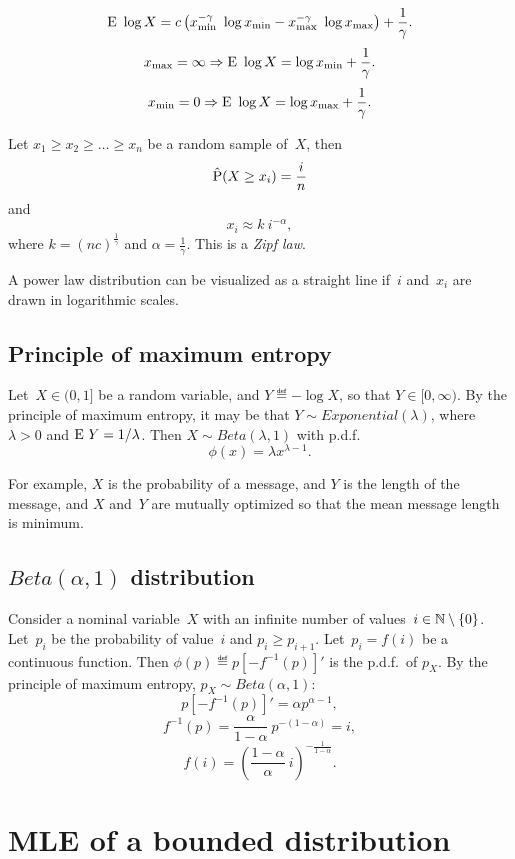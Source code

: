 \documentclass[10pt,a4paper]{article}
\theoremstyle{plain} \newtheorem{Lem}{Lemma}
\begin{document}
$$ \E \log X 
= c \left(  x_{\mathrm {min}}^{-\gamma} \ \log x_{\mathrm {min}} 
- x_{\mathrm {max}}^{-\gamma} \ \log x_{\mathrm {max}} 
\right)
+ \frac 1 \gamma.
$$
$$ x_{\mathrm {max}} = \infty \implies \E \log X = \log x_{\mathrm {min}} + \frac 1 \gamma. $$
$$ x_{\mathrm {min}} = 0      \implies \E \log X = \log x_{\mathrm {max}} + \frac 1 \gamma. $$

Let $x_1 \ge x_2 \ge \dots \ge x_n$ be a random sample of~$X$,
then
$$ \hat \P(X \ge x_i) = \frac i n $$
and
$$ x_i \approx  k \ i^{- \alpha}, $$
where $k = (nc)^{\frac 1 \gamma}$ and $\alpha = \frac 1 \gamma$.
This is a {\em Zipf law}.

A power law distribution can be visualized as a straight line 
if~$i$ and~$x_i$ are drawn in logarithmic scales.



\subsection{Principle of maximum entropy}

Let~$X \in (0,1]$ be a random variable, and $Y \eqdef - \log X$, so that $Y \in [0,\infty)$.
By the principle of maximum entropy, it may be that $Y \sim Exponential(\lambda)$, where $\lambda > 0$ and $\E Y = 1/\lambda$.
Then $X \sim Beta(\lambda,1)$ with p.d.f.
$$ \phi(x) = \lambda x^{\lambda - 1}. $$


For example, $X$ is the probability of a message, and $Y$ is the length of the message, 
and $X$ and~$Y$ are mutually optimized so that the mean message length is minimum.


\subsection{$Beta(\alpha,1)$ distribution}

Consider a nominal variable~$X$ with an infinite number of values~$i \in \N \setminus \{0\}$.
Let~$p_i$ be the probability of value~$i$ and $p_i \ge p_{i+1}$.
Let~$p_i=f(i)$ be a continuous function.
Then $\phi(p) \eqdef p [- f^{-1}(p)]'$ is the p.d.f.~of $p_X$.
By the principle of maximum entropy, $p_X \sim Beta(\alpha,1)$:
$$ p [- f^{-1}(p)]' = \alpha p^{\alpha - 1}, $$
$$ f^{-1}(p) = \frac \alpha {1 - \alpha} \ p^{-(1-\alpha)} = i, $$
$$ f(i) = \left(\frac {1-\alpha} \alpha \ i \right)^{-\frac 1 {1-\alpha}}. $$




\section{MLE of a bounded distribution}
\end{document}
